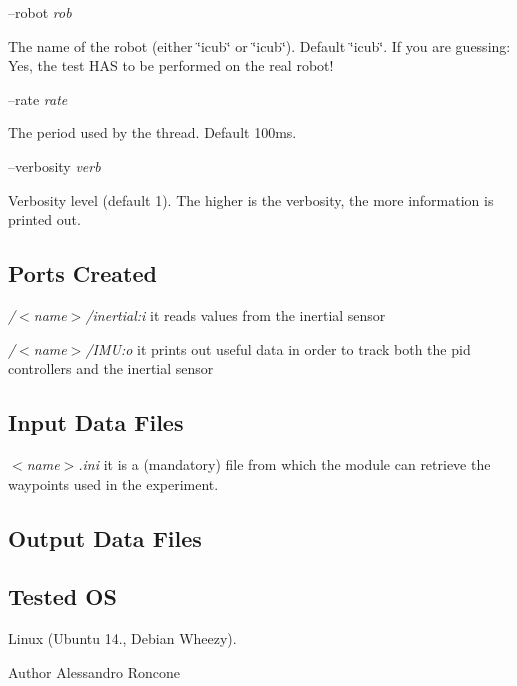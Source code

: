--robot {\itshape rob} 
\begin{DoxyItemize}
\item The name of the robot (either \char`\"{}icub\char`\"{} or \char`\"{}icub\char`\"{}). Default \char`\"{}icub\char`\"{}. If you are guessing\+: Yes, the test H\+A\+S to be performed on the real robot!
\end{DoxyItemize}

--rate {\itshape rate} 
\begin{DoxyItemize}
\item The period used by the thread. Default 100ms.
\end{DoxyItemize}

--verbosity {\itshape verb} 
\begin{DoxyItemize}
\item Verbosity level (default 1). The higher is the verbosity, the more information is printed out.
\end{DoxyItemize}\hypertarget{group__icub__iCubWriter_portsc_sec}{}\subsection{Ports Created}\label{group__icub__iCubWriter_portsc_sec}

\begin{DoxyItemize}
\item {\itshape  /$<$name$>$/inertial\+:i } it reads values from the inertial sensor
\item {\itshape  /$<$name$>$/\+I\+M\+U\+:o } it prints out useful data in order to track both the pid controllers and the inertial sensor
\end{DoxyItemize}\hypertarget{group__icub__iCubBreather_in_files_sec}{}\subsection{Input Data Files}\label{group__icub__iCubBreather_in_files_sec}

\begin{DoxyItemize}
\item {\itshape  $<$name$>$.ini } it is a (mandatory) file from which the module can retrieve the waypoints used in the experiment.
\end{DoxyItemize}\hypertarget{group__icub__iCubBreather_out_data_sec}{}\subsection{Output Data Files}\label{group__icub__iCubBreather_out_data_sec}
\hypertarget{group__icub__iCubWriter_tested_os_sec}{}\subsection{Tested O\+S}\label{group__icub__iCubWriter_tested_os_sec}
Linux (Ubuntu 14., Debian Wheezy).

\begin{DoxyAuthor}{Author}
Alessandro Roncone 
\end{DoxyAuthor}
